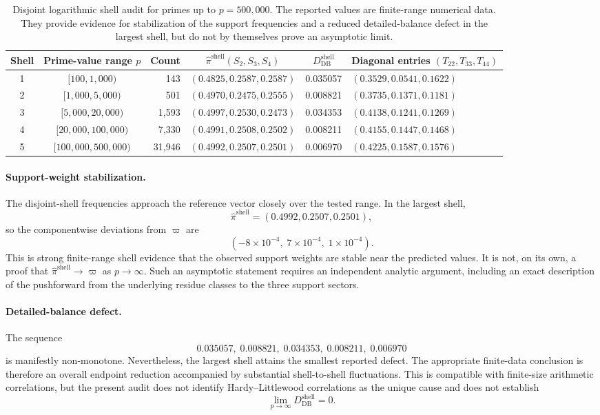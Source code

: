\documentclass{article}
\begin{document}
\begin{table}[htbp]
\centering
\small
\caption{Disjoint logarithmic shell audit for primes up to \(p=500{,}000\).  The
reported values are finite-range numerical data.  They provide evidence for
stabilization of the support frequencies and a reduced detailed-balance defect in the
largest shell, but do not by themselves prove an asymptotic limit.}
\label{tab:disjoint-shell-audit}
\begin{tabularx}{\textwidth}{@{}c c r c c X@{}}
\toprule
Shell & Prime-value range \(p\) & Count &
\(\widehat\pi^{\mathrm{shell}}(S_2,S_3,S_4)\) &
\(D_{\mathrm{DB}}^{\mathrm{shell}}\) &
Diagonal entries \((T_{22},T_{33},T_{44})\) \\
\midrule
1 & \([100,1{,}000)\) & 143 &
\((0.4825,0.2587,0.2587)\) & 0.035057 &
\((0.3529,0.0541,0.1622)\) \\
2 & \([1{,}000,5{,}000)\) & 501 &
\((0.4970,0.2475,0.2555)\) & 0.008821 &
\((0.3735,0.1371,0.1181)\) \\
3 & \([5{,}000,20{,}000)\) & 1,593 &
\((0.4997,0.2530,0.2473)\) & 0.034353 &
\((0.4138,0.1241,0.1269)\) \\
4 & \([20{,}000,100{,}000)\) & 7,330 &
\((0.4991,0.2508,0.2502)\) & 0.008211 &
\((0.4155,0.1447,0.1468)\) \\
5 & \([100{,}000,500{,}000)\) & 31,946 &
\((0.4992,0.2507,0.2501)\) & \(\mathbf{0.006970}\) &
\((0.4225,0.1587,0.1576)\) \\
\bottomrule
\end{tabularx}
\end{table}

\paragraph{Support-weight stabilization.}
The disjoint-shell frequencies approach the reference vector closely over the tested
range.  In the largest shell,
\[
\widehat\pi^{\mathrm{shell}}=(0.4992,0.2507,0.2501),
\]
so the componentwise deviations from \(\varpi\) are
\[
(-8\times10^{-4},\;7\times10^{-4},\;1\times10^{-4}).
\]
This is strong finite-range shell evidence that the observed support weights are stable
near the predicted values.  It is not, on its own, a proof that
\(\widehat\pi^{\mathrm{shell}}\to\varpi\) as \(p\to\infty\).  Such an asymptotic
statement requires an independent analytic argument, including an exact description of
the pushforward from the underlying residue classes to the three support sectors.

\paragraph{Detailed-balance defect.}
The sequence
\[
0.035057,\;0.008821,\;0.034353,\;0.008211,\;0.006970
\]
is manifestly non-monotone.  Nevertheless, the largest shell attains the smallest
reported defect.  The appropriate finite-data conclusion is therefore an overall
endpoint reduction accompanied by substantial shell-to-shell fluctuations.  This is
compatible with finite-size arithmetic correlations, but the present audit does not
identify Hardy--Littlewood correlations as the unique cause and does not establish
\[
\lim_{p\to\infty}D_{\mathrm{DB}}^{\mathrm{shell}}=0.
\]
\end{document}
